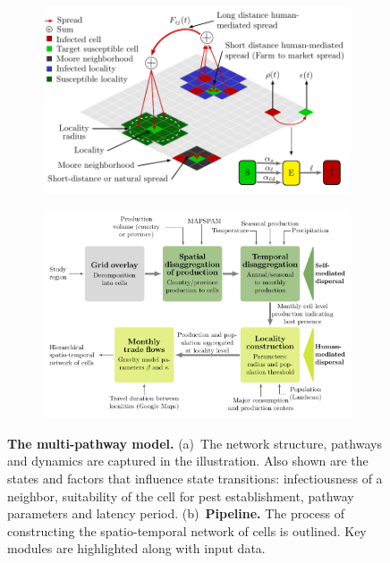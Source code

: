 \documentclass[11pt]{article}
\theoremstyle{definition}
\begin{document}
\begin{figure}[t]
\centering
\begin{subfigure}[b]{.4\textwidth}
    \includegraphics[width=1.1\textwidth]{figs/model_schematic.pdf}
\caption{\label{fig:concept}}
\end{subfigure}
\begin{subfigure}[b]{.56\textwidth}
    \includegraphics[width=1.05\textwidth]{figs/pipeline.pdf}
\caption{\label{fig:pipeline}}
\end{subfigure}
\caption{\textbf{The multi-pathway model.} (a)~The network structure,
pathways and dynamics are captured in the illustration.
Also shown are the states and factors
that influence state transitions: infectiousness of a neighbor, suitability
of the cell for pest establishment, pathway parameters and latency period.
\label{fig:modelConcept}
(b)~\textbf{Pipeline.} The process of constructing the spatio-temporal
network of cells is outlined. Key modules are highlighted along with 
input data.}
\end{figure}
\end{document}

